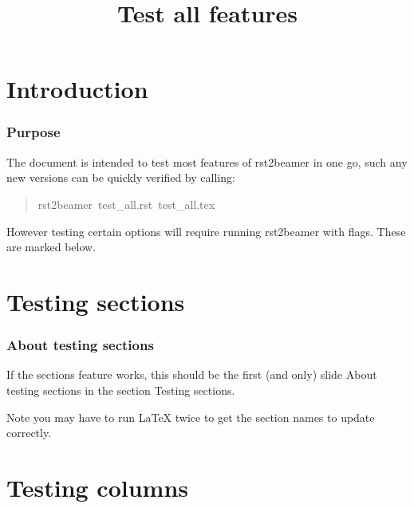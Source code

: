 \documentclass[t]{beamer}
\begin{document}
\title[Test all features]{Test all features%
  \label{test-all-features}}
\author[]{}
\date{}
\maketitle


\section{Introduction%
  \label{introduction}%
}

\begin{frame}[fragile]
\frametitle{Purpose}


The document is intended to test most features of rst2beamer in one go, such
any new versions can be quickly verified by calling:
%
\begin{quote}{\ttfamily \raggedright \noindent
rst2beamer~test\_all.rst~test\_all.tex
}
\end{quote}

However testing certain options will require running rst2beamer with flags.
These are marked below.

\end{frame}


\section{Testing sections%
  \label{testing-sections}%
}

\begin{frame}[fragile]
\frametitle{About testing sections}


If the sections feature works, this should be the first (and only) slide
\textquotedbl{}About testing sections\textquotedbl{} in the section \textquotedbl{}Testing sections\textquotedbl{}.

Note you may have to run LaTeX twice to get the section names to update
correctly.

\end{frame}


\section{Testing columns%
  \label{testing-columns}%
}
\end{document}
